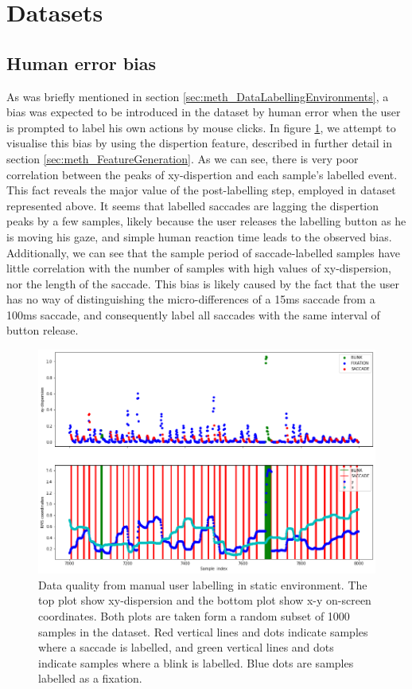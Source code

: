 \section{Datasets} \label{sec:res_Datasets}

\subsection{Human error bias}

As was briefly mentioned in section \ref{sec:meth_DataLabellingEnvironments}, a bias was expected to be introduced in the dataset by human error when the user is prompted to label his own actions by mouse clicks. In figure \ref{fig:res_HumanErrorBias}, we attempt to visualise this bias by using the dispertion feature, described in further detail in section \ref{sec:meth_FeatureGeneration}. As we can see, there is very poor correlation between the peaks of xy-dispertion and each sample's labelled event. This fact reveals the major value of the post-labelling step, employed in dataset represented above. It seems that labelled saccades are lagging the dispertion peaks by a few samples, likely because the user releases the labelling button as he is moving his gaze, and simple human reaction time leads to the observed bias. Additionally, we can see that the sample period of saccade-labelled samples have little correlation with the number of samples with high values of xy-dispersion, nor the length of the saccade. This bias is likely caused by the fact that the user has no way of distinguishing the micro-differences of a 15ms saccade from a 100ms saccade, and consequently label all saccades with the same interval of button release. 

\begin{figure}[h]
    \centering
    \includegraphics[width=\textwidth]{Images/Dataset/DQ_V1.png}
    \caption{Data quality from manual user labelling in static environment. The top plot show xy-dispersion and the bottom plot show x-y on-screen coordinates. Both plots are taken form a random subset of 1000 samples in the dataset. Red vertical lines and dots indicate samples where a saccade is labelled, and green vertical lines and dots indicate samples where a blink is labelled. Blue dots are samples labelled as a fixation.}
    \label{fig:res_HumanErrorBias}
\end{figure}

